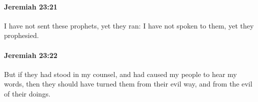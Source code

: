 		\paragraph{Jeremiah 23:21} %
			\label{JEREMIAH-23-21}

			I have not sent these prophets, yet they ran: I have not spoken to them, yet they prophesied.


		\paragraph{Jeremiah 23:22} %
			\label{JEREMIAH-23-22}

			But if they had stood in my counsel, and had caused my people to hear my words, then they should have turned them from their evil way, and from the evil of their doings.


